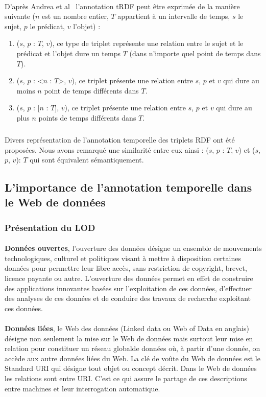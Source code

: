 \paragraph{}
D'après Andrea et al~\cite{pugliese2008} l’annotation tRDF peut être exprimée de la manière suivante ($n$ est un nombre entier, $T$ appartient à un intervalle de temps, $s$ le sujet, $p$ le prédicat, $v$ l'objet) :
\begin{enumerate}
\item ($s$, $p$ : {$T$}, $v$), ce type de triplet représente une relation entre le sujet et le prédicat et l'objet dure un temps $T$ (dans n'importe quel point de temps dans $T$).
\item ($s$, $p$ : <$n$ : $T$>, $v$), ce triplet présente une relation entre $s$, $p$ et $v$ qui dure au moins $n$ point de temps différents dans $T$.
\item ($s$, $p$ : [$n$ : $T$], $v$), ce triplet présente une relation entre $s$, $p$ et $v$ qui dure au plus $n$ points de temps différents dans $T$.
\end{enumerate}
\subparagraph{}
Divers représentation de l'annotation temporelle des triplets RDF ont été proposées. Nous avons remarqué une similarité entre eux ainsi : ($s$, $p$ : {$T$}, $v$) et ($s$, $p$, $v$): $T$ qui sont équivalent sémantiquement.	
\subsection{L'importance de l'annotation temporelle dans le Web de données}
\subsubsection{Présentation du LOD}
\paragraph{}
{\bf Données ouvertes}, l'ouverture des données désigne un ensemble de mouvements technologiques, culturel et politiques visant à mettre à disposition certaines données pour permettre leur libre accès, sans restriction de copyright, brevet, licence payante ou autre.
L'ouverture des données permet en effet de construire des applications innovantes basées sur l'exploitation de ces données, d'effectuer des analyses de ces données et de conduire des travaux de recherche exploitant ces données.
\paragraph{}
{\bf Données liées}, le Web des données (Linked data ou Web of Data en anglais) désigne non seulement la mise sur le Web de données mais surtout leur mise en relation pour constituer un réseau globalde données où, à partir d'une donnée, on accède aux autre données liées du Web. La clé de voûte du Web de données est le Standard URI qui désigne tout objet ou concept décrit. Dans le Web de données les relations sont entre URI. C'est ce qui assure le partage de ces descriptions entre machines et leur interrogation automatique.
